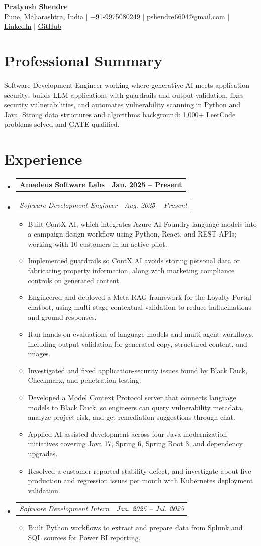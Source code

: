 \documentclass[a4paper,11pt]{article}
\makeatletter
\newcommand{\bulletpoint}[1]{\item\small{#1}}
\newcommand{\company}[2]{\item\begin{tabularx}{\textwidth}{@{}Xr@{}}\textbf{#1}& \textbf{#2}\end{tabularx}\vspace{-4pt}}
\newcommand{\role}[2]{\item\begin{tabularx}{\textwidth}{@{}Xr@{}}\textit{\small #1}&\textit{\small #2}\end{tabularx}\vspace{-5pt}}
\makeatother
\begin{document}
\begin{center}
  {\Large\bfseries Pratyush Shendre}\\[2pt]
  \small Pune, Maharashtra, India $|$ +91-9975080249 $|$
  \href{mailto:pshendre6604@gmail.com}{pshendre6604@gmail.com} $|$
  \href{https://www.linkedin.com/in/pratyush-shendre-2256a7223/}{\underline{LinkedIn}} $|$
  \href{https://github.com/PratyushS04}{\underline{GitHub}}
\end{center}

\section{Professional Summary}
\small Software Development Engineer working where generative AI meets application security: builds LLM applications with guardrails and output validation, f{}ixes security vulnerabilities, and automates vulnerability scanning in Python and Java. Strong data structures and algorithms background: 1,000+ LeetCode problems solved and GATE qualif{}ied.

\section{Experience}
\begin{itemize}[leftmargin=0in,label={}]
  \company{Amadeus Software Labs}{Jan. 2025 -- Present}
  \role{Software Development Engineer}{Aug. 2025 -- Present}
  \begin{itemize}
    \bulletpoint{Built ContX AI, which integrates Azure AI Foundry language models into a campaign-design workf{}low using Python, React, and REST APIs; working with 10 customers in an active pilot.}
    \bulletpoint{Implemented guardrails so ContX AI avoids storing personal data or fabricating property information, along with marketing compliance controls on generated content.}
    \bulletpoint{Engineered and deployed a Meta-RAG framework for the Loyalty Portal chatbot, using multi-stage contextual validation to reduce hallucinations and ground responses.}
    \bulletpoint{Ran hands-on evaluations of language models and multi-agent workf{}lows, including output validation for generated copy, structured content, and images.}
    \bulletpoint{Investigated and f{}ixed application-security issues found by Black Duck, Checkmarx, and penetration testing.}
    \bulletpoint{Developed a Model Context Protocol server that connects language models to Black Duck, so engineers can query vulnerability metadata, analyze project risk, and get remediation suggestions through chat.}
    \bulletpoint{Applied AI-assisted development across four Java modernization initiatives covering Java 17, Spring 6, Spring Boot 3, and dependency upgrades.}
    \bulletpoint{Resolved a customer-reported stability defect, and investigate about f{}ive production and regression issues per month with Kubernetes deployment validation.}
  \end{itemize}
  \role{Software Development Intern}{Jan. 2025 -- Jul. 2025}
  \begin{itemize}
    \bulletpoint{Built Python workf{}lows to extract and prepare data from Splunk and SQL sources for Power BI reporting.}
  \end{itemize}
\end{itemize}
\end{document}
